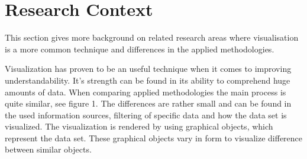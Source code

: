 


\section{Research Context}
This section gives more background on related research areas where visualisation is a more common technique and differences in the applied methodologies.

Visualization has proven to be an useful technique when it comes to improving understandability. It’s strength can be found in its ability to comprehend huge amounts of data. When comparing applied methodologies the main process is quite similar, see figure 1. The differences are rather small and can be found in the used information sources, filtering of specific data and how the data set is visualized. The visualization is rendered by using graphical objects, which represent the data set. These graphical objects vary in form to visualize difference between similar objects.

